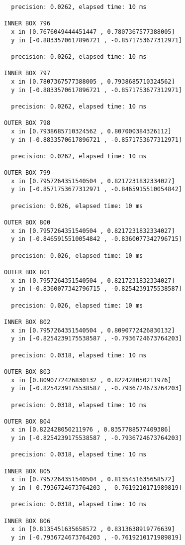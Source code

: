 \begin{verbatim}
  precision: 0.0262, elapsed time: 10 ms

INNER BOX 796
  x in [0.7676049444451447 , 0.7807367577388005]
  y in [-0.8833570617896721 , -0.8571753677312971]

  precision: 0.0262, elapsed time: 10 ms

INNER BOX 797
  x in [0.7807367577388005 , 0.7938685710324562]
  y in [-0.8833570617896721 , -0.8571753677312971]

  precision: 0.0262, elapsed time: 10 ms

OUTER BOX 798
  x in [0.7938685710324562 , 0.807000384326112]
  y in [-0.8833570617896721 , -0.8571753677312971]

  precision: 0.0262, elapsed time: 10 ms

OUTER BOX 799
  x in [0.7957264351540504 , 0.8217231832334027]
  y in [-0.8571753677312971 , -0.8465915510054842]

  precision: 0.026, elapsed time: 10 ms

OUTER BOX 800
  x in [0.7957264351540504 , 0.8217231832334027]
  y in [-0.8465915510054842 , -0.8360077342796715]

  precision: 0.026, elapsed time: 10 ms

OUTER BOX 801
  x in [0.7957264351540504 , 0.8217231832334027]
  y in [-0.8360077342796715 , -0.8254239175538587]

  precision: 0.026, elapsed time: 10 ms

INNER BOX 802
  x in [0.7957264351540504 , 0.8090772426830132]
  y in [-0.8254239175538587 , -0.7936724673764203]

  precision: 0.0318, elapsed time: 10 ms

OUTER BOX 803
  x in [0.8090772426830132 , 0.822428050211976]
  y in [-0.8254239175538587 , -0.7936724673764203]

  precision: 0.0318, elapsed time: 10 ms

OUTER BOX 804
  x in [0.822428050211976 , 0.8357788577409386]
  y in [-0.8254239175538587 , -0.7936724673764203]

  precision: 0.0318, elapsed time: 10 ms

INNER BOX 805
  x in [0.7957264351540504 , 0.8135451635658572]
  y in [-0.7936724673764203 , -0.7619210171989819]

  precision: 0.0318, elapsed time: 10 ms

INNER BOX 806
  x in [0.8135451635658572 , 0.8313638919776639]
  y in [-0.7936724673764203 , -0.7619210171989819]


\end{verbatim}
